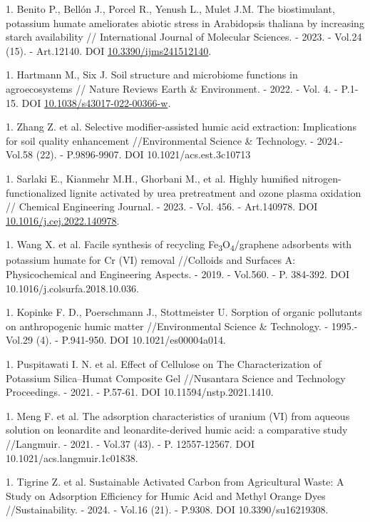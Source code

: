1. Benito P., Bellón J., Porcel R., Yenush L., Mulet J.M. The
biostimulant, potassium humate ameliorates abiotic stress in
Arabidopsis thaliana by increasing starch availability //
International Journal of Molecular Sciences. - 2023. - Vol.24 (15). -
Art.12140. DOI
\href{https://doi.org/10.3390/ijms241512140}{10.3390/ijms241512140}.

1. Hartmann M., Six J. Soil structure and microbiome functions in
agroecosystems // Nature Reviews Earth \& Environment. - 2022. - Vol.
4. - P.1-15. DOI
\href{http://dx.doi.org/10.1038/s43017-022-00366-w}{10.1038/s43017-022-00366-w}.

1. Zhang Z. et al. Selective modifier-assisted humic acid extraction:
Implications for soil quality enhancement //Environmental Science \&
Technology. - 2024.- Vol.58 (22). - P.9896-9907. DOI
10.1021/acs.est.3c10713

1. Sarlaki E., Kianmehr M.H., Ghorbani M., et al. Highly humified
nitrogen-functionalized lignite activated by urea pretreatment and
ozone plasma oxidation // Chemical Engineering Journal. - 2023. - Vol.
456. - Art.140978. DOI
\href{https://doi.org/10.1016/j.cej.2022.140978}{10.1016/j.cej.2022.140978}.

1. Wang X. et al. Facile synthesis of recycling
Fe\textsubscript{3}O\textsubscript{4}/graphene adsorbents with
potassium humate for Cr (VI) removal //Colloids and Surfaces A:
Physicochemical and Engineering Aspects. - 2019. - Vol.560. - P.
384-392. DOI 10.1016/j.colsurfa.2018.10.036.

1. Kopinke F. D., Poerschmann J., Stottmeister U. Sorption of organic
pollutants on anthropogenic humic matter //Environmental Science \&
Technology. - 1995.-Vol.29 (4). - P.941-950. DOI
10.1021/es00004a014.

1. Puspitawati I. N. et al. Effect of Cellulose on The Characterization
of Potassium Silica--Humat Composite Gel //Nusantara Science and
Technology Proceedings. - 2021. - P.57-61. DOI
10.11594/nstp.2021.1410.

1. Meng F. et al. The adsorption characteristics of uranium (VI) from
aqueous solution on leonardite and leonardite-derived humic acid: a
comparative study //Langmuir. - 2021. - Vol.37 (43). - P.
12557-12567. DOI 10.1021/acs.langmuir.1c01838.

1. Tigrine Z. et al. Sustainable Activated Carbon from Agricultural
Waste: A Study on Adsorption Efficiency for Humic Acid and Methyl
Orange Dyes //Sustainability. - 2024. - Vol.16 (21). - P.9308. DOI
10.3390/su16219308.

